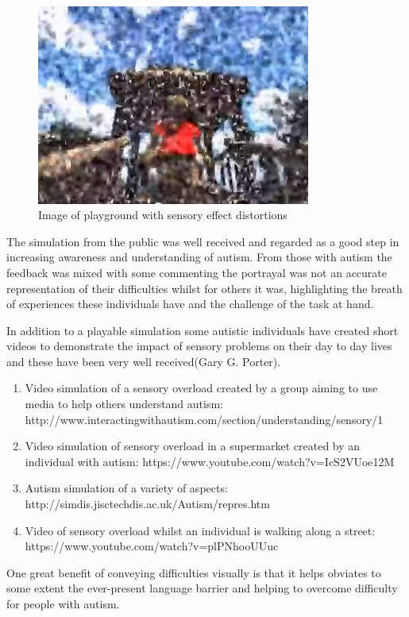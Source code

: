 \begin{figure}[H]
\centering
\includegraphics[width=90mm]{images/litreview/autisim2.png}
\caption{Image of playground with sensory effect distortions}
\label{autisim2}
\end{figure}


The simulation from the public was well received and regarded as a good step in increasing awareness and understanding of autism. From those with autism the feedback was mixed with some commenting the portrayal was not an accurate representation of their difficulties whilst for others it was, highlighting the breath of experiences these individuals have and the challenge of the task at hand.

In addition to a playable simulation some autistic individuals have created short videos to demonstrate the impact of sensory problems on their day to day lives and these have been very well received(Gary G. Porter). 
\begin{enumerate}
\item Video simulation of a sensory overload created by a group aiming to use media to help others understand autism: http://www.interactingwithautism.com/section/understanding/sensory/1
\item Video simulation of sensory overload in a supermarket created by an individual with autism: https://www.youtube.com/watch?v=IcS2VUoe12M
\item Autism simulation of a variety of aspects: http://simdis.jisctechdis.ac.uk/Autism/repres.htm
\item Video of sensory overload whilst an individual is walking along a street: https://www.youtube.com/watch?v=plPNhooUUuc
\end{enumerate}

One great benefit of conveying difficulties visually is that it helps obviates to some extent the ever-present language barrier and helping to overcome difficulty for people with autism.  